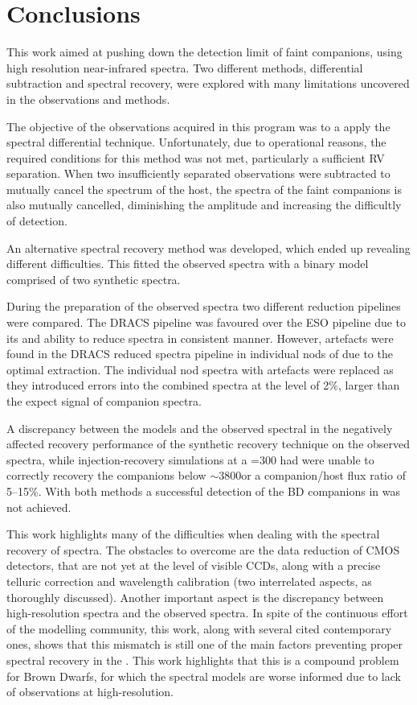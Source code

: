
\chapter{Conclusions}  %
\label{cha:conclusions}

This work aimed at pushing down the detection limit of faint companions, using high resolution near-infrared spectra.
Two different methods, differential subtraction and \textchisquared{} spectral recovery,  were explored with many limitations uncovered in the observations and methods.

The objective of the observations acquired in this program was to a apply the spectral differential technique.
Unfortunately, due to operational reasons, the required conditions for this method was not met, particularly a sufficient RV separation.
When two insufficiently separated observations were subtracted to mutually cancel the spectrum of the host, the spectra of the faint companions is also mutually cancelled, diminishing the amplitude and increasing the difficultly of detection.

An alternative \textchisquared{} spectral recovery method was developed, which ended up revealing different difficulties.
This fitted the observed spectra with a binary model comprised of two synthetic spectra.

During the preparation of the observed spectra two different reduction pipelines were compared.
The {DRACS} pipeline was favoured over the {ESO} pipeline due to its and ability to reduce spectra in consistent manner.
However, artefacts were found in the {DRACS} reduced spectra pipeline in individual nods of due to the optimal extraction.
The individual nod spectra with artefacts were replaced as they introduced errors into the combined spectra at the level of 2\%, larger than the expect signal of companion spectra.

A discrepancy between the models and the observed spectral in the \nir{} negatively affected recovery performance of the synthetic recovery technique on the observed spectra, while injection-recovery simulations at a \snr{}=300 had were unable to correctly recovery the companions below \(\sim\)3800\K or a companion/host flux ratio of 5--15\%.
With both methods a successful detection of the {BD} companions in \nir{} was not achieved.

This work highlights many of the difficulties when dealing with the spectral recovery of \nir{} spectra.
The obstacles to overcome are the data reduction of \nir{} CMOS detectors, that are not yet at the level of visible CCDs, along with a precise telluric correction and wavelength calibration (two interrelated aspects, as thoroughly discussed).
Another important aspect is the discrepancy between \nir{} high-resolution spectra and the observed spectra.
In spite of the continuous effort of the modelling community, this work, along with several cited contemporary ones, shows that this mismatch is still one of the main factors preventing proper spectral recovery in the \nir{}.
This work highlights that this is a compound problem for Brown Dwarfs, for which the spectral models are worse informed due to lack of observations at high-resolution.

